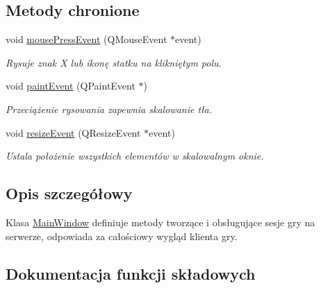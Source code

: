 \subsection*{Metody chronione}
\begin{DoxyCompactItemize}
\item 
void \mbox{\hyperlink{classMainWindow_a2b5463ae209a03d1680b39c950dac8be}{mouse\+Press\+Event}} (Q\+Mouse\+Event $\ast$event)
\begin{DoxyCompactList}\small\item\em Rysuje znak X lub ikonę statku na klikniętym polu. \end{DoxyCompactList}\item 
\mbox{\label{classMainWindow_a2da19b23a75b83dcc8b8f6b6128463a3}} 
void \mbox{\hyperlink{classMainWindow_a2da19b23a75b83dcc8b8f6b6128463a3}{paint\+Event}} (Q\+Paint\+Event $\ast$)
\begin{DoxyCompactList}\small\item\em Przeciążenie rysowania zapewnia skalowanie tła. \end{DoxyCompactList}\item 
\mbox{\label{classMainWindow_ae12f8f63791595567b6250f8bb002bda}} 
void \mbox{\hyperlink{classMainWindow_ae12f8f63791595567b6250f8bb002bda}{resize\+Event}} (Q\+Resize\+Event $\ast$event)
\begin{DoxyCompactList}\small\item\em Ustala położenie wszystkich elementów w skalowalnym oknie. \end{DoxyCompactList}\end{DoxyCompactItemize}


\subsection{Opis szczegółowy}
Klasa \mbox{\hyperlink{classMainWindow}{Main\+Window}} definiuje metody tworzące i obsługujące sesje gry na serwerze, odpowiada za całościowy wygląd klienta gry. 

\subsection{Dokumentacja funkcji składowych}
\mbox{\label{classMainWindow_a86257929f80454cadd0a45a87e28497f}} 
